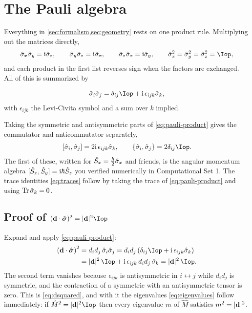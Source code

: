 \section{The Pauli algebra}
\label{app:pauli}

Everything in \cref{sec:formalism,sec:geometry} rests on one product rule. Multiplying
out the matrices directly,
%
\begin{equation}
\sxo\syo = \ii\szo,\qquad \syo\szo = \ii\sxo,\qquad \szo\sxo = \ii\syo,
\qquad
\sxo^2=\syo^2=\szo^2=\Iop,
\end{equation}
%
and each product in the first list reverses sign when the factors are exchanged. All of
this is summarized by

\begin{keyresult}
\vspace{-0.35cm}
\begin{equation}
\hat\sigma_i\hat\sigma_j = \delta_{ij}\Iop + \ii\,\epsilon_{ijk}\hat\sigma_k ,
\label{eq:pauli-product}
\end{equation}
with $\epsilon_{ijk}$ the Levi-Civita symbol and a sum over $k$ implied.
\end{keyresult}

\noindent
Taking the symmetric and antisymmetric parts of \cref{eq:pauli-product} gives the
commutator and anticommutator separately,
%
\begin{equation}
\left[\hat\sigma_i,\hat\sigma_j\right] = 2\ii\,\epsilon_{ijk}\hat\sigma_k,
\qquad
\left\{\hat\sigma_i,\hat\sigma_j\right\} = 2\delta_{ij}\Iop .
\label{eq:pauli-comm}
\end{equation}
%
The first of these, written for $\hat{S}_x=\tfrac{\hbar}{2}\hat{\sigma}_x$ and friends, is the angular
momentum algebra $[\hat{S}_x,\hat{S}_y]=\mathrm{i}\hbar\hat{S}_z$ you verified numerically in Computational
Set 1. The trace identities \eqref{eq:traces} follow by taking the trace of
\cref{eq:pauli-product} and using $\operatorname{Tr}\hat\sigma_k=0$.

\subsection*{Proof of $(\dvec\cdot\pauliv)^2 = |\dvec|^2\Iop$}

Expand and apply \cref{eq:pauli-product}:
%
\begin{align}
\left(\dvec\cdot\pauliv\right)^2
 &= d_i d_j\,\hat\sigma_i\hat\sigma_j
  = d_i d_j\left(\delta_{ij}\Iop + \ii\,\epsilon_{ijk}\hat\sigma_k\right) \nonumber\\
 &= |\dvec|^2\,\Iop + \ii\,\epsilon_{ijk}\,d_i d_j\,\hat\sigma_k
  = |\dvec|^2\,\Iop .
\label{eq:dsq-proof}
\end{align}
%
The second term vanishes because $\epsilon_{ijk}$ is antisymmetric in $i\leftrightarrow j$
while $d_i d_j$ is symmetric, and the contraction of a symmetric with an antisymmetric
tensor is zero. This is \cref{eq:dsquared}, and with it the eigenvalues
\eqref{eq:eigenvalues} follow immediately: if $\hat{M}^2 = |\dvec|^2\Iop$ then every
eigenvalue $m$ of $\hat{M}$ satisfies $m^2=|\mathbf{d}|^2$.

